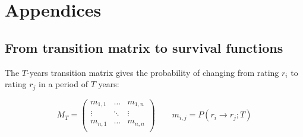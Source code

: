 \documentclass[a4paper,12pt,final]{article}
\begin{document}

\newpage
\appendix
\section{Appendices}

\subsection{From transition matrix to survival functions}
\label{ap:tmatrix}
The $T$-years transition matrix gives the probability of changing from rating $r_i$ 
to rating $r_j$ in a period of $T$ years:

\begin{displaymath}
M_T = \left(
\begin{array}{ccc}
m_{1,1} & \dots  & m_{1,n} \\
\vdots & \ddots & \vdots   \\
m_{n,1} & \dots  & m_{n,n} \\
\end{array}
\right)
\qquad
m_{i,j} = P(r_i \to r_j;T)
\end{displaymath}
\end{document}
